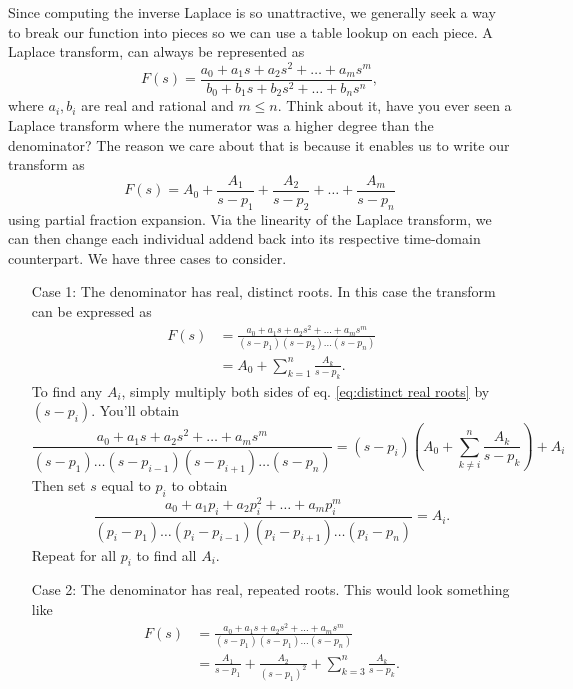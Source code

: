 \documentclass[nobib]{tufte-handout}
\begin{document}
Since computing the inverse Laplace 
is so unattractive, we generally 
seek a way to break our function
into pieces so we can use a table 
lookup on each piece. 
A Laplace transform, can always be represented as 
\[F(s) = \frac{a_0 + a_1s + a_2s^2 + \dots + a_m s^m}{b_0 + b_1s + b_2s^2 + \dots + b_n s^n},\]
where $a_i, b_i$ are real and rational
and $m \leq n$. Think about it, have 
you ever seen a Laplace transform 
where the numerator was a higher
degree than the denominator? 
The reason we care about that is because it
enables us to write our transform as 
\[F(s) = A_0 + \frac{A_1}{s-p_1}+\frac{A_2}{s-p_2}+\dots+\frac{A_m}{s-p_n}\]
using partial fraction expansion. Via 
the linearity of the Laplace transform, 
we can then change each individual addend 
back into its respective time-domain counterpart. 
We have three cases to consider. 
\begin{enumerate}
    \item[Case 1:] The denominator 
    has real, distinct roots. In 
    this case the transform can be
    expressed as 
    \begin{align} \label{eq:distinct real roots}
        F(s) &= \frac{a_0+a_1s+a_2s^2+\dots+a_ms^m}{(s-p_1)(s-p_2)\dots (s-p_n)} \\
        &= A_0 + \sum_{k=1}^{n} \frac{A_k}{s-p_k}.
    \end{align}
    To find any $A_i$, simply multiply both sides 
    of eq. \ref{eq:distinct real roots} by $(s-p_i)$.
    You'll obtain 
    \begin{equation}
        \frac{a_0+a_1s+a_2s^2+\dots+a_ms^m}{(s-p_1)\dots (s-p_{i-1}) (s-p_{i+1}) \dots (s-p_n)} = (s-p_i) \left(A_0 + \sum_{k \neq i}^{n} \frac{A_k}{s-p_k}\right) + A_i
    \end{equation}
    Then set $s$ equal to $p_i$ to obtain
    \begin{equation}
        \frac{a_0+a_1p_i+a_2p^2_i+\dots+a_mp^m_i}{(p_i-p_1)\dots (p_i-p_{i-1}) (p_i-p_{i+1}) \dots (p_i-p_n)} = A_i.
    \end{equation}
    Repeat for all $p_i$ to find all $A_i$. 
    \item[Case 2:] The denominator has 
    real, repeated roots. This would look 
    something like 
    \begin{align} \label{repeated real roots}
        F(s) &= \frac{a_0+a_1s+a_2s^2+\dots+a_ms^m}{(s-p_1)(s-p_1)\dots (s-p_n)} \\
        &= \frac{A_1}{s-p_1} + \frac{A_2}{(s-p_1)^2} + \sum_{k=3}^{n} \frac{A_k}{s-p_k}.
    \end{align}

\end{enumerate}
\end{document}
